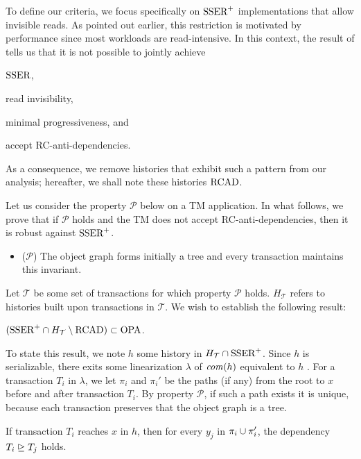 To define our criteria, we focus specifically on $\SPSER$ implementations that allow invisible reads.
As pointed out earlier, this restriction is motivated by performance since most workloads are read-intensive.
In this context, the result of \citet{hans16} tells us that it is not possible to jointly achieve
\begin{inparaenum}
\item $\SSER$,
\item read invisibility,
\item minimal progressiveness, and
\item accept RC-anti-dependencies.
\end{inparaenum}
As a consequence, we remove histories that exhibit such a pattern from our analysis;
hereafter, we shall note these histories $\RCAD$.

Let us consider the property $\mathcal{P}$ below on a TM application.
In what follows, we prove that if $\mathcal{P}$ holds and the TM does not accept RC-anti-dependencies, then it is robust against $\SPSER$.
\begin{itemize}
  \item($\mathcal{P}$) The object graph forms initially a tree and every transaction maintains this invariant.
\end{itemize}
Let $\mathcal{T}$ be some set of transactions for which property $\mathcal{P}$ holds.
$H_{\mathcal{T}}$ refers to histories built upon transactions in $\mathcal{T}$.
We wish to establish the following result:

\begin{proposition}
  $(\SPSER \inter H_{\mathcal{T}} \setminus \RCAD) \subset \OPA$.
\end{proposition}

To state this result, we note $h$ some history  in $H_{\mathcal{T}} \inter \SPSER$.
Since $h$ is serializable, there exits some linearization $\lambda$ of $\committed{h}$ equivalent to $h$ \cite{}.
For a transaction $T_i$ in $\lambda$, we let $\pi_i$ and $\pi_i'$ be the paths (if any) from the root to $x$ before and after transaction $T_i$.
By property $\mathcal{P}$, if such a path exists it is unique, because each transaction preserves that the object graph is a tree.

\begin{lemma}
  If transaction $T_i$ reaches $x$ in $h$, then for every $y_j$ in $\pi_i \cup \pi_i'$, the dependency $T_i \mathrel{\unrhd} T_j$ holds. 
\end{lemma}

